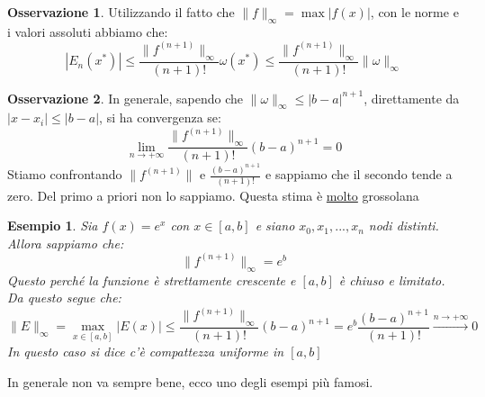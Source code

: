 \documentclass[11pt,a4paper,twoside]{article}
\newtheorem{es}{Esempio}
\theoremstyle{definition}
\newtheorem*{oss}{Osservazione}
\begin{document}
\begin{oss}
	Utilizzando il fatto che $\|f\|_\infty = \max |f(x)|$, con le norme e i valori assoluti abbiamo che:
	\[ |E_n(x^*)| \leq \frac{\|f^{(n+1)}\|_\infty}{(n+1)!} \omega(x^*) \leq \frac{\|f^{(n+1)}\|_\infty}{(n+1)!} \| \omega\|_\infty \]
\end{oss}

\begin{oss}
	In generale, sapendo che $\|\omega\|_\infty \leq |b-a|^{n+1}$, direttamente da $|x-x_i|\leq |b-a|$, si ha convergenza se:
	\[\lim_{n \to +\infty} \frac{\|f^{(n+1)}\|_\infty}{(n+1)!}(b-a)^{n+1} = 0 \]
	Stiamo confrontando $\|f^{(n+1)}\|$ e $\frac{(b-a)^{n+1}}{(n+1)!}$ e sappiamo che il secondo tende a zero. Del primo a priori non lo sappiamo. Questa stima è \underline{molto} grossolana
\end{oss}

\begin{es}
	Sia $f(x) = e^x$ con $x \in [a,b]$ e siano $x_0,x_1,...,x_n$ nodi distinti. Allora sappiamo che:
	\[ \|f^{(n+1)}\|_\infty = e^b \]
	Questo perché la funzione è strettamente crescente e $[a,b]$ è chiuso e limitato. Da questo segue che:
	\[ \|E\|_\infty = \max_{x \in [a,b]}|E(x)| \leq \frac{\|f^{(n+1)}\|_\infty}{(n+1)!} (b-a)^{n+1} = e^b \frac{(b-a)^{n+1}}{(n+1)!} \xrightarrow{n \to +\infty}0 \]
	In questo caso si dice c'è compattezza uniforme in $[a,b]$
\end{es}

In generale non va sempre bene, ecco uno degli esempi più famosi.
\end{document}
